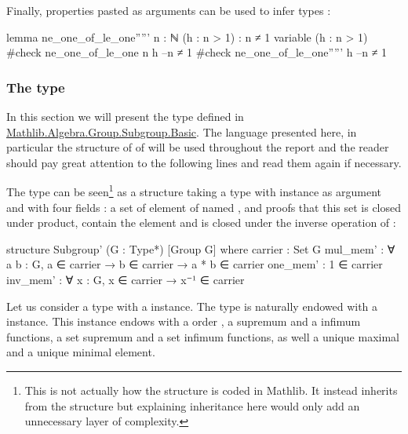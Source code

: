 Finally, properties pasted as arguments can be used to infer types :
\begin{leancode}
lemma ne_one_of_le_one''''' {n : ℕ} (h : n > 1) : n ≠ 1
variable (h : n > 1)
#check ne_one_of_le_one n h --n ≠ 1
#check ne_one_of_le_one''''' h --n ≠ 1
\end{leancode}

\subsubsection{The  type}
\label{subsub:subgroup}
In this section we will present the type  defined in \href{https://github.com/leanprover-community/mathlib4/blob/318082b0bccc3abd9d654496f7b60267f277d5fd/Mathlib/Algebra/Group/Subgroup/Basic.lean}{Mathlib.Algebra.Group.Subgroup.Basic}.
The language presented here, in particular the structure of  of  will be used throughout the report and the reader should pay great attention to the following lines and read them again if necessary.

The  type can be seen\footnote{This is not actually how the  structure is coded in Mathlib. It instead inherits from the  structure but explaining inheritance here would only add an unnecessary layer of complexity.} as a structure taking a type  with \lean{[Group G]} instance as argument and with four fields : a set of element of  named , and proofs that this set is closed under product, contain the element  and is closed under the inverse operation of  :

\begin{leancode}
structure Subgroup' (G : Type*) [Group G] where
    carrier : Set G
    mul_mem' : ∀ {a b : G}, a ∈ carrier → b ∈ carrier → a * b ∈ carrier
    one_mem' : 1 ∈ carrier
    inv_mem' : ∀ {x : G}, x ∈ carrier → x⁻¹ ∈ carrier
\end{leancode}

Let us consider a type  with a \lean{[Group G]} instance.
The type  is naturally endowed with a  instance. This instance endows  with a order , a supremum  and a infimum  functions, a set supremum  and a set infimum  functions, as well a unique maximal  and a unique minimal  element.

